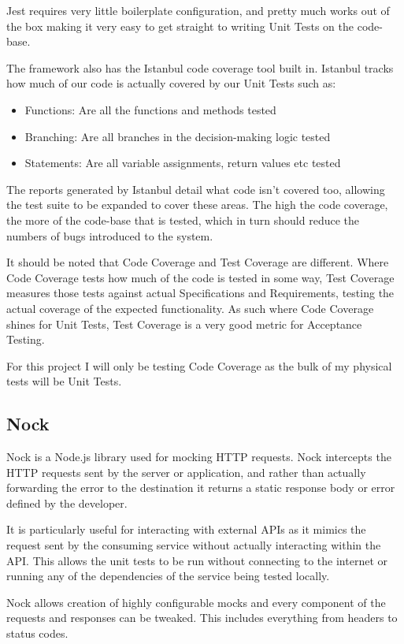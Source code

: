 Jest requires very little boilerplate configuration, and pretty much works out of the box making it very easy to get straight to writing Unit Tests on the code-base.

The framework also has the Istanbul code coverage tool built in. Istanbul tracks how much of our code is actually covered by our Unit Tests such as:
\begin{itemize}
    \item Functions: Are all the functions and methods tested
    \item Branching: Are all branches in the decision-making logic tested
    \item Statements: Are all variable assignments, return values etc tested
\end{itemize}

The reports generated by Istanbul detail what code isn't covered too, allowing the test suite to be expanded to cover these areas. The high the code coverage, the more of the code-base that is tested, which in turn should reduce the numbers of bugs introduced to the system.

It should be noted that Code Coverage and Test Coverage are different. Where Code Coverage tests how much of the code is tested in some way, Test Coverage measures those tests against actual Specifications and Requirements, testing the actual coverage of the expected functionality. As such where Code Coverage shines for Unit Tests, Test Coverage is a very good metric for Acceptance Testing.

For this project I will only be testing Code Coverage as the bulk of my physical tests will be Unit Tests.
\subsection{Nock}
Nock is a Node.js library used for mocking HTTP requests. Nock intercepts the HTTP requests sent by the server or application, and rather than actually forwarding the error to the destination it returns a static response body or error defined by the developer. 

It is particularly useful for interacting with external APIs as it mimics the request sent by the consuming service without actually interacting within the API. This allows the unit tests to be run without connecting to the internet or running any of the dependencies of the service being tested locally. 

Nock allows creation of highly configurable mocks and every component of the requests and responses can be tweaked. This includes everything from headers to status codes.

